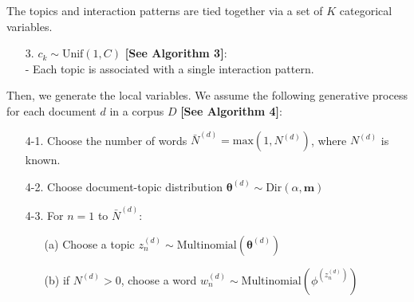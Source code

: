 \documentclass[a4paper]{article}
\begin{document}
\noindent The topics and interaction patterns are tied together via a set of $K$ categorical variables.
\begin{itemize}
	\item[3.] $c_k\sim \mbox{Unif}(1, C)$ \textbf{[See Algorithm 3]}: \\
	- Each topic is associated with a single interaction pattern.\\
\end{itemize}
\noindent Then, we generate the local variables. We assume the following generative process for each document $d$ in a corpus $D$ \textbf{[See Algorithm 4]}:
\begin{itemize}
	\item[4-1.] Choose the number of words $\bar N^{(d)} = \mbox{max}(1,  N^{(d)})$, where $N^{(d)}$ is known.
	\item[4-2.] Choose document-topic distribution $\boldsymbol{\theta}^{(d)}\sim \mbox{Dir}(\alpha, \boldsymbol{m})$
	\item[4-3.] For $n=1$ to $\bar N^{(d)}$:
	\begin{itemize}
		\item[(a)] Choose a topic $z_n^{(d)} \sim \mbox{Multinomial}(\boldsymbol{\theta}^{(d)})$
		\item[(b)] if $N^{(d)}>0$, choose a word $w_n^{(d)} \sim\mbox{Multinomial} (\phi^{(z_n^{(d)})})$
	\end{itemize}
\end{itemize}
\end{document}
